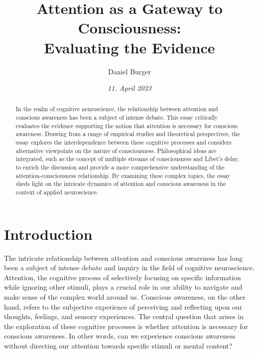 \documentclass[10pt]{article}
\title{\textbf{Attention as a Gateway to Consciousness:} \\ Evaluating the Evidence}
\author[ ]{Daniel Burger}
\affil[ ]{\textbf{King’s College London}}
\affil[ ]{\href{mailto:public@danielburger.online}{public@danielburger.online}}
\date{\textit{11. April 2023}}
\begin{document}

\maketitle
\thispagestyle{empty}

\begin{sloppypar} %
  \begin{abstract}
    In the realm of cognitive neuroscience, the relationship between attention and conscious awareness has been a subject of intense debate. This essay critically evaluates the evidence supporting the notion that attention is necessary for conscious awareness. Drawing from a range of empirical studies and theoretical perspectives, the essay explores the interdependence between these cognitive processes and considers alternative viewpoints on the nature of consciousness. Philosophical ideas are integrated, such as the concept of multiple streams of consciousness and Libet’s delay, to enrich the discussion and provide a more comprehensive understanding of the attention-consciousness relationship. By examining these complex topics, the essay sheds light on the intricate dynamics of attention and conscious awareness in the context of applied neuroscience.

  \end{abstract}
  \pagebreak

  \tableofcontents
  \pagebreak

  \listoffigures
  \pagebreak

  \listoftables
  \pagebreak


  \doublespacing

  \section{Introduction}
  \label{sec:introduction}

  The intricate relationship between attention and conscious awareness has long been a subject of intense debate and inquiry in the field of cognitive neuroscience. Attention, the cognitive process of selectively focusing on specific information while ignoring other stimuli, plays a crucial role in our ability to navigate and make sense of the complex world around us. Conscious awareness, on the other hand, refers to the subjective experience of perceiving and reflecting upon our thoughts, feelings, and sensory experiences. The central question that arises in the exploration of these cognitive processes is whether attention is necessary for conscious awareness. In other words, can we experience conscious awareness without directing our attention towards specific stimuli or mental content?


\end{sloppypar}
\end{document}
